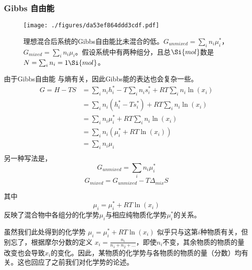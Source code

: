 \subsubsection{Gibbs 自由能}

\begin{figure}[ht]
\centering
\texttt{[image: ./figures/da53ef864ddd3cdf.pdf]}
\caption{理想混合后系统的Gibbs自由能比未混合的低。$G_{unmixed}=\sum_i n_i \mu_i^*$，$G_{mixed}= \sum_i n_i \mu_i$。假设系统中有两种组分，且总$\Si{mol}$数是$N=\sum_i n_i =1 \Si{mol}$。} \label{fig_IMCPTV_2}
\end{figure}
由于Gibbs自由能 与熵有关，因此Gibbs能的表达也会复杂一些。
$$
\begin{aligned}
G = H-TS &= \sum_i n_i h_i^* - T \sum_i n_i s_i^* + RT \sum_i n_i \ln (x_i)\\ 
&= \sum_i n_i (h_i^* - T s_i^*) + RT \sum_i n_i \ln (x_i)\\
& = \sum_i n_i \mu_i^* + RT \sum_i n_i \ln (x_i)\\
&=\sum_i n_i (\mu_i^* + RT \ln (x_i))\\
&= \sum_i n_i \mu_i\\
\end{aligned}
$$
另一种写法是，
$$G_{unmixed}=\sum_i n_i \mu_i^*$$
$$G_{mixed}= G_{unmixed} - T \Delta_{mix} S$$

其中
$$
\mu_i = \mu_i^* + RT \ln (x_i)
$$
反映了混合物中各组分的化学势$\mu_i$与相应纯物质化学势$\mu_i^*$的关系。%

虽然我们此处得到的化学势 $\mu_i = \mu_i^* + RT \ln (x_i)$ 似乎只与这第$i$种物质有关，但别忘了，根据摩尔分数的定义 $x_i = \frac{n_i}{n_1+n_2+...}$，即使$n_i$不变，其余物质的物质的量改变也会导致$x_i$的变化。因此，某物质的化学势与各物质的物质的量（分数）均有关。这也回应了之前我们对化学势的论述。
